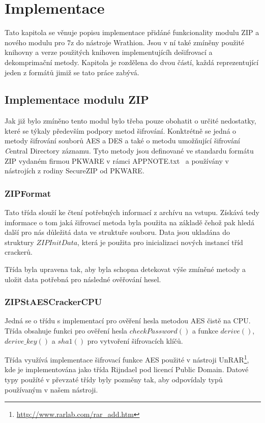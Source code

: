 \chapter{Implementace}
\label{ch:implementace}
Tato kapitola se věnuje popisu implementace přidáné funkcionality modulu ZIP a nového modulu pro
7z do nástroje Wrathion. Jsou v ní také zmíněny použité knihovny a verze použitých knihoven
implementujícíh dešifrovací a dekomprimační metody. Kapitola je rozdělena do dvou částí, každá
reprezentující jeden z formátů jimiž se tato práce zabývá.

\section{Implementace modulu ZIP}
Jak již bylo zmíněno tento modul bylo třeba pouze obohatit o určité nedostatky, které se týkaly
především podpory metod šifrování. Konktrétně se jedná o metody šifrování souborů AES a DES a také
o metodu umožňující šifrování {\textit Central Directory} záznamu. Tyto metody jsou definované ve
standardu formátu ZIP vydaném firmou PKWARE v rámci APPNOTE.txt~\cite{PKWARE:2014} a používány v
nástrojích z rodiny SecureZIP od PKWARE.

\subsection{ZIPFormat}
Tato třída slouží ke čtení potřebných informací z archívu na vstupu. Získává tedy imformace o tom
jaká šifrovací metoda byla použita na základě čehož pak hledá další pro nás důležitá data ve
struktuře souboru. Data jsou ukladána do struktury $ZIPInitData$, která je použita pro
inicializaci nových instancí tříd crackerů. 

 Třída byla upravena tak, aby byla schopna detekovat výše zmíněné metody a uložit data potřebná pro
následné ověřování hesel.

\subsection{ZIPStAESCrackerCPU}
Jedná se o třídu s implementací pro ověření hesla metodou AES čistě na CPU. Třída obsahuje funkci
pro ověření hesla $checkPassword()$ a funkce $derive()$, $derive\_key()$ a $sha1()$ pro vytvoření
šifrovacích klíčů.

Třída využívá implementace šifrovací funkce AES použité v nástroji
UnRAR\footnote{\url{http://www.rarlab.com/rar\_add.htm}}, kde je implementována jako třída Rijndael
pod licencí Public Domain. Datové typy použíté v převzaté třídy byly pozměny tak, aby odpovídaly
typů používaným v našem nástroji.

